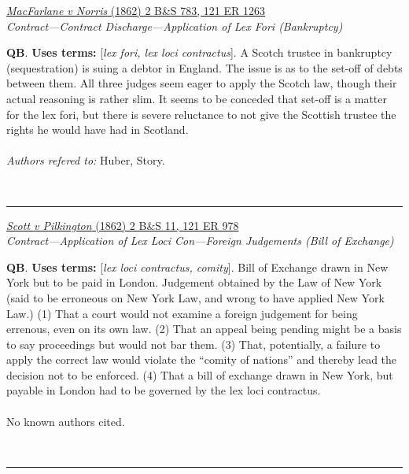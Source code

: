 \documentclass[twoside]{article}
\begin{document}
        \begin{small}
        \begin{center}
        \href{https://heinonline.org/HOL/P?h=hein.engrep/engrf0121&i=1267}{\textit{MacFarlane v Norris} (1862) 2 B\&S 783, 121 ER 1263} \label{116} \\ 
\textit{Contract---Contract Discharge---Application of Lex Fori (Bankruptcy)}\\
        \end{center}
        \textbf{QB}.  \textbf{Uses terms: }[\textit{lex fori, lex loci contractus}]. A Scotch trustee in bankruptcy (sequestration) is suing a debtor in England. The issue is as to the set-off of debts between them. All three judges seem eager to apply the Scotch law, though their actual reasoning is rather slim. It seems to be conceded that set-off is a matter for the lex fori, but there is severe reluctance to not give the Scottish trustee the rights he would have had in Scotland.\\\\\textit{Authors refered to: }Huber, Story.
        \end{small}\\
        \rule{\textwidth}{0.5pt}
        

        \begin{small}
        \begin{center}
        \href{https://heinonline.org/HOL/P?h=hein.engrep/engrf0121&i=982}{\textit{Scott v Pilkington} (1862) 2 B\&S 11, 121 ER 978} \label{118} \\ 
\textit{Contract---Application of Lex Loci Con---Foreign Judgements (Bill of Exchange)}\\
        \end{center}
        \textbf{QB}.  \textbf{Uses terms: }[\textit{lex loci contractus, comity}]. Bill of Exchange drawn in New York but to be paid in London. Judgement obtained by the Law of New York (said to be erroneous on New York Law, and wrong to have applied New York Law.) (1) That a court would not examine a foreign judgement for being errenous, even on its own law. (2) That an appeal being pending might be a basis to say proceedings but would not bar them. (3) That, potentially, a failure to apply the correct law would violate the “comity of nations” and thereby lead the decision not to be enforced. (4) That a bill of exchange drawn in New York, but payable in London had to be governed by the lex loci contractus.\\\\No known authors cited.
        \end{small}\\
        \rule{\textwidth}{0.5pt}
        
\end{document}

